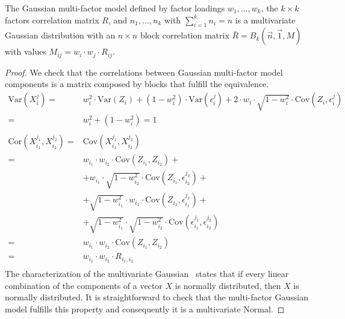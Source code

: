 \documentclass[11pt,fleqn]{book} %
\begin{document}
\begin{proposition}
	\label{prop:gmfigs}
	The Gaussian multi-factor model defined by factor loadings 
	$w_1,\dots,w_k$, the $k {\times} k$ factors correlation matrix $R$, and
	$n_1,\dots,n_k$ with $\sum_{i=1}^k n_i = n$ is a multivariate Gaussian 
	distribution with an $n {\times} n$ block correlation matrix 
	$\bar{R}=B_k(\vec{n},\vec{1},M)$ with values
	$M_{ij} = w_i \cdot w_j \cdot R_{ij}$.
\end{proposition}
\begin{proof}
	We check that the correlations between Gaussian multi-factor model
	components is a matrix composed by blocks that fulfill the equivalence.
	\begin{displaymath}
		\begin{array}{rl}
			\text{Var}(X_i^j) =                       &
			w_i^2 \cdot \text{Var}(Z_i) + (1-w_i^2) \cdot \text{Var}(\epsilon_i^j) +
			2 \cdot w_i \cdot \sqrt{1-w_i^2} \cdot \text{Cov}(Z_i, \epsilon_i^j)    \\
			=                                         & w_i^2 + (1-w_i^2) = 1       \\
			                                          &                             \\
			\text{Cor}(X_{i_1}^{j_1},X_{i_2}^{j_2}) = & \text{Cov}(X_{i_1}^{j_1},X_{i_2}^{j_2})                                                                    \\
			=                                         & w_{i_1} \cdot w_{i_2} \cdot \text{Cov}(Z_{i_1},Z_{i_2}) +                                                  \\
			                                          & + w_{i_1} \cdot \sqrt{1-w_{i_2}^2} \cdot \text{Cov}(Z_{i_1}, \epsilon_{i_2}^{j_2}) +                       \\
			                                          & + \sqrt{1-w_{i_1}^2} \cdot w_{i_2} \cdot \text{Cov}(Z_{i_2}, \epsilon_{i_1}^{j_1}) +                       \\
			                                          & + \sqrt{1-w_{i_1}^2} \cdot \sqrt{1-w_{i_2}^2} \cdot \text{Cov}(\epsilon_{i_1}^{j_1}, \epsilon_{i_2}^{j_2}) \\
			=                                         & w_{i_1} \cdot w_{i_2} \cdot \text{Cov}(Z_{i_1}, Z_{i_2})                                                   \\
			=                                         & w_{i_1} \cdot w_{i_2} \cdot R_{i_1,i_2}                                                                    \\
		\end{array}
	\end{displaymath}
	The characterization of the multivariate Gaussian~\cite[thm. 2.6.2]{anderson:1984}
	states that if every linear combination of the components of a 
	vector $X$ is normally distributed, then $X$ is normally distributed.
	It is straightforward to check that the multi-factor Gaussian model 
	fulfills this property and consequently it is a multivariate Normal.
\end{proof}
\end{document}
